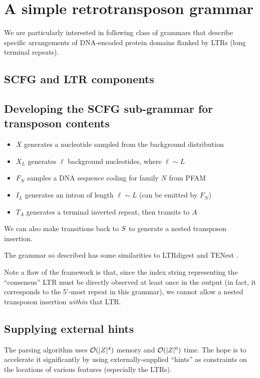 \documentclass[10pt]{article}
\newcommand{\seclabel}[1]{\label{sec:#1}}
\begin{document}
\section{A simple retrotransposon grammar}
\seclabel{RetroGrammar}

We are particularly interested in following class of grammars that describe specific arrangements of DNA-encoded protein domains flanked by LTRs (long terminal repeats).

\subsection{SCFG and LTR components}

\subsection{Developing the SCFG sub-grammar for transposon contents}

\begin{itemize}
\item $X$ generates a nucleotide sampled from the background distribution
\item $X_L$ generates $\ell$ background nucleotides, where $\ell \sim L$
\item $F_N$ samples a DNA sequence coding for family $N$ from PFAM \cite{Pfam2008}
\item $I_L$ generates an intron of length $\ell \sim L$ (can be emitted by $F_N$)
\item $T_A$ generates a terminal inverted repeat, then transits to $A$
\end{itemize}
We can also make transitions back to $S$ to generate a nested transposon insertion.

The grammar so described has some similarities to LTRdigest \cite{pmid19786494} and TENest \cite{KronmillerWise2008}.

Note a flaw of the framework is that, since the index string representing the ``consensus'' LTR must be directly observed at least once in the output
(in fact, it corresponds to the 5'-most repeat in this grammar), 
we cannot allow a nested transposon insertion {\em within} that LTR.


\subsection{Supplying external hints}

The parsing algorithm uses ${\cal O}(|Z|^4)$ memory and ${\cal O}(|Z|^6)$ time.
The hope is to accelerate it significantly by using externally-supplied ``hints''
as constraints on the locations of various features (especially the LTRs).
\end{document}
